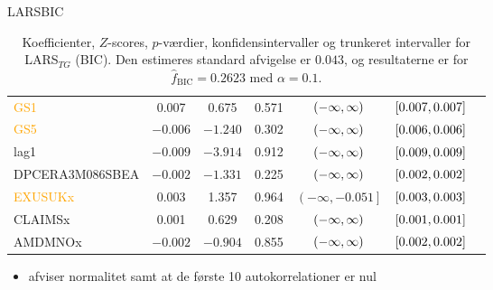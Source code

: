 \begin{frame}{LARS}{BIC}
\begin{table}[ht]
{\begin{tabular}{lcccccc}
 \textcolor{orange}{GS1} &  0.007&   0.675  & 0.571 &      $\del{-\infty   ,  \infty }$ &   $\sbr{0.007 ,  0.007}$     \\
 \textcolor{orange}{GS5} &   $-0.006$ &$ -1.240$  & 0.302&      $\del{-\infty   ,  \infty }$&   $\sbr{0.006,  0.006}$   \\
 \textcolor{blue3}{lag1} & $-0.009$ & $ -3.914  $  &  0.912   &  $\del{-\infty   ,  \infty }$& $\sbr{0.009,   0.009 }$   \\
  \textcolor{red3}{DPCERA3M086SBEA}   & $-0.002$ &  $-1.331  $ & 0.225 &      $\del{-\infty   ,  \infty }$& $\sbr{0.002,   0.002 }$   \\
 \textcolor{orange}{EXUSUKx} & 0.003 &  1.357   & 0.964  &    $\left( -\infty   ,  -0.051\right] $&  $\sbr{0.003 ,  0.003}$   \\
 \textcolor{blue3}{CLAIMSx} &  0.001  & 0.629  & 0.208   &   $\del{-\infty   ,  \infty }$ & $\sbr{ 0.001 ,  0.001 }$  \\
 \textcolor{red3}{AMDMNOx} &  $-0.002$ &  $-0.904 $   & 0.855     &  $\del{-\infty   ,  \infty }$&$\sbr{0.002 ,  0.002}$  \\ \bottomrule
\end{tabular}  
}
\caption{Koefficienter, \(Z\)-scores, \(p\)-værdier, konfidensintervaller og trunkeret intervaller for LARS$_{TG}$ (BIC). Den estimeres standard afvigelse er \(0.043\), og resultaterne er for \(\widehat{f}_{\text{BIC}} = 0.2623 \) med \(\alpha = 0.1\).} \label{tab:larInf_bic}
\end{table} 
 \begin{itemize}
\item afviser normalitet samt at de første 10 autokorrelationer er nul
\end{itemize}
\end{frame}


